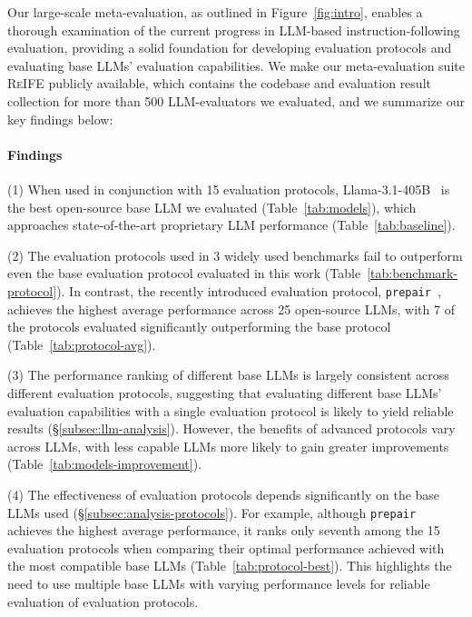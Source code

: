 \documentclass[11pt]{article}
\newcommand{\ours}{\textsc{ReIFE}\xspace}
\begin{document}
Our large-scale meta-evaluation, as outlined in Figure~\ref{fig:intro}, enables a thorough examination of the current progress in LLM-based instruction-following evaluation, providing a solid foundation for developing evaluation protocols and evaluating base LLMs' evaluation capabilities.
We make our meta-evaluation suite \ours publicly available, which contains the codebase and evaluation result collection for more than 500 LLM-evaluators we evaluated,  and we summarize our key findings below:

\paragraph{Findings}
\noindent (1) When used in conjunction with 15 evaluation protocols, Llama-3.1-405B~\cite{dubey2024llama} is the best open-source base LLM we evaluated (Table~\ref{tab:models}), which approaches state-of-the-art proprietary LLM performance (Table~\ref{tab:baseline}).

\noindent (2) The evaluation protocols used in 3 widely used benchmarks fail to outperform even the base evaluation protocol evaluated in this work (Table~\ref{tab:benchmark-protocol}).
In contrast, the recently introduced evaluation protocol, \texttt{prepair}~\citep{jeong2024prepair}, achieves the highest average performance across 25 open-source LLMs, with 7 of the protocols evaluated significantly outperforming the base protocol (Table~\ref{tab:protocol-avg}).


\noindent (3) 
% 
The performance ranking of different base LLMs is largely consistent across different evaluation protocols, suggesting that evaluating different base LLMs' evaluation capabilities with a single evaluation protocol is likely to yield reliable results (\S\ref{subsec:llm-analysis}).
However, the benefits of advanced protocols vary across LLMs, with less capable LLMs more likely to gain greater improvements (Table~\ref{tab:models-improvement}).

\noindent (4) The effectiveness of evaluation protocols depends significantly on the base LLMs used (\S\ref{subsec:analysis-protocols}). 
For example, although \texttt{prepair} achieves the highest average performance, it ranks only seventh among the 15 evaluation protocols when comparing their optimal performance achieved with the most compatible base LLMs (Table~\ref{tab:protocol-best}). 
This highlights the need to use multiple base LLMs with varying performance levels for reliable evaluation of evaluation protocols.
\end{document}
